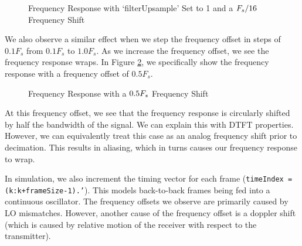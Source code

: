 \documentclass{article}
\begin{document}
\begin{figure}[H]
	\centerline{}
	\caption{Frequency Response with `filterUpsample' Set to 1 and a $\protect{F_s/16}$ Frequency Shift}
	\label{fig::psd_upsample_1_mod_shift}
\end{figure}

\noindent We also observe a similar effect when we step the frequency offset in steps of $0.1F_s$ from $0.1F_s$ to $1.0F_s$. As we increase the frequency offset, we see the frequency response wraps. In Figure \ref{fig::psd_freq_offset_05}, we specifically show the frequency response with a frequency offset of $0.5F_s$. 

\begin{figure}[H]
	\centerline{}
	\caption{Frequency Response with a $\protect{0.5F_s}$ Frequency Shift}
	\label{fig::psd_freq_offset_05}
\end{figure}

\noindent At this frequency offset, we see that the frequency response is circularly shifted by half the bandwidth of the signal. We can explain this with DTFT properties. However, we can equivalently treat this case as an analog frequency shift prior to decimation. This results in aliasing, which in turns causes our frequency response to wrap.

	In simulation, we also increment the timing vector for each frame (\texttt{timeIndex = (k:k+frameSize-1).'}). This models back-to-back frames being fed into a continuous oscillator. The frequency offsets we observe are primarily caused by LO mismatches. However, another cause of the frequency offset is a doppler shift (which is caused by relative motion of the receiver with respect to the transmitter).
\end{document}
